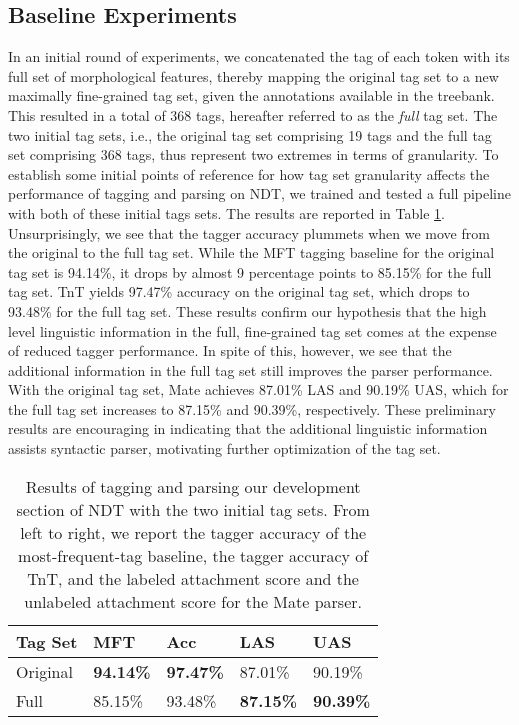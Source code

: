 \documentclass[11pt,a4paper]{article}
\begin{document}
\subsection{Baseline Experiments}
In an initial round of experiments, we concatenated the tag of each token with
its full set of morphological features, thereby mapping the original tag set to a
new maximally fine-grained tag set, given the annotations available in the
treebank. This resulted in a total of 368 tags,
hereafter referred to as the \emph{full} tag set.
The two initial tag sets, i.e., the original tag set comprising 19 tags and the
full tag set comprising 368 tags, thus represent two extremes in terms of
granularity.
To establish some initial points of reference for how tag set granularity affects the
performance of tagging and parsing on NDT, we trained and tested a full pipeline with both of
these initial tags sets. The results are reported in Table \ref{inittagseteval}.
Unsurprisingly, we see that the tagger accuracy
plummets when we move from the original to the full tag set. While the MFT
tagging baseline for the original tag set is 94.14\%, it drops by almost 9
percentage points to 85.15\% for the full tag set. TnT yields 
97.47\% accuracy on the original tag set, which drops to 93.48\% for the full tag
set. These results confirm our hypothesis that the high level linguistic
information
in the full, fine-grained tag set comes at the expense of reduced tagger
performance.  In spite of this, however, we see that the additional information
in the full tag set still improves the parser performance. With the original tag set, Mate
achieves 87.01\% LAS and 90.19\% UAS, which for the full tag set increases to 87.15\% and
90.39\%, respectively. These
preliminary results are encouraging in indicating that the additional linguistic
information assists syntactic parser, motivating further optimization of the
tag set.

\begin{table}
    \centering
    \smaller[0.5]
    \begin{tabular}{@{}lllll@{}}
        \toprule
        \textbf{Tag Set} & \textbf{MFT} & \textbf{Acc} &
        \textbf{LAS} & \textbf{UAS} \\
        \midrule
        Original & \textbf{94.14\%} & \textbf{97.47\%} & 87.01\% & 90.19\% \\
        Full & 85.15\% & 93.48\% & \textbf{87.15\%} & \textbf{90.39\%} \\
        \bottomrule
    \end{tabular}
    \caption{Results of tagging and parsing our development section of NDT with
        the two initial tag sets. From left to right, we report the tagger
        accuracy of the most-frequent-tag baseline, the tagger accuracy of TnT,
        and the labeled attachment score and the unlabeled attachment score for
        the Mate parser.}
    \label{inittagseteval}
\end{table}
\end{document}
